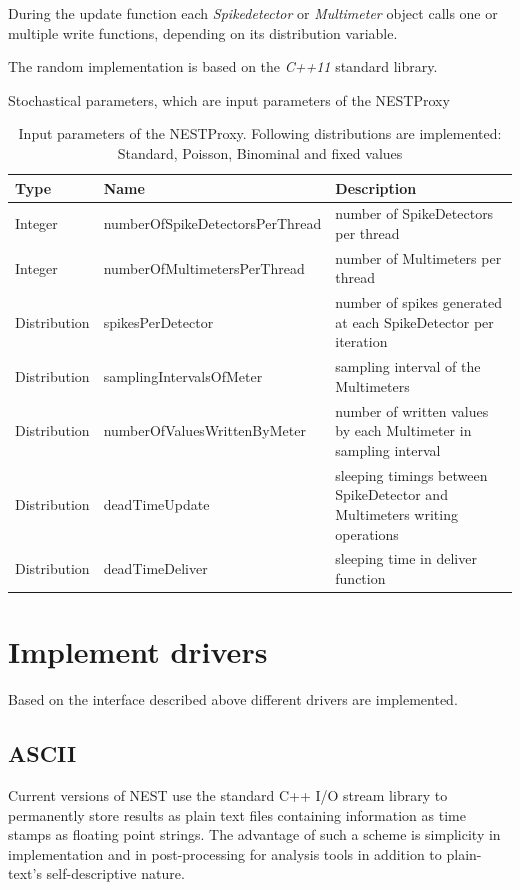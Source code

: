 \documentclass[]{YIC2015}
\begin{document}
During the update function each \emph{Spikedetector} or
\emph{Multimeter} object calls one or multiple write functions,
depending on its distribution variable.

The random implementation is based on the \emph{C++11} standard library.
\begin{table}[htdp]
\caption{Stochastical parameters, which are input parameters of the NESTProxy}
\centering
\begin{tabular}{lll}
\hline\hline
\textbf{Type} & \textbf{Name}                   & \textbf{Description} \\ \hline
Integer       & numberOfSpikeDetectorsPerThread & number of SpikeDetectors per thread  \\
Integer       & numberOfMultimetersPerThread    & number of Multimeters per thread  \\
Distribution  & spikesPerDetector               & number of spikes generated at each SpikeDetector per iteration  \\
Distribution  & samplingIntervalsOfMeter        & sampling interval of the Multimeters  \\
Distribution  & numberOfValuesWrittenByMeter    & number of written values by each Multimeter in sampling interval  \\
Distribution  & deadTimeUpdate                  & sleeping timings between SpikeDetector and Multimeters writing operations \\
Distribution  & deadTimeDeliver                 & sleeping time in deliver function  \\
\hline\hline
\end{tabular}
\label{tab:table-silva1}
\caption{Input parameters of the NESTProxy. Following distributions
are implemented: Standard, Poisson, Binominal and fixed values}
\end{table}

\section{Implement drivers}
Based on the interface described above different drivers are
implemented.

\subsection{ASCII}

Current versions of NEST use the standard C++ I/O stream library
\cite{stream} to permanently store results as plain text files
containing information as time stamps as floating point strings. The
advantage of such a scheme is simplicity in implementation and in
post-processing for analysis tools in addition to plain-text's
self-descriptive nature.
\end{document}
